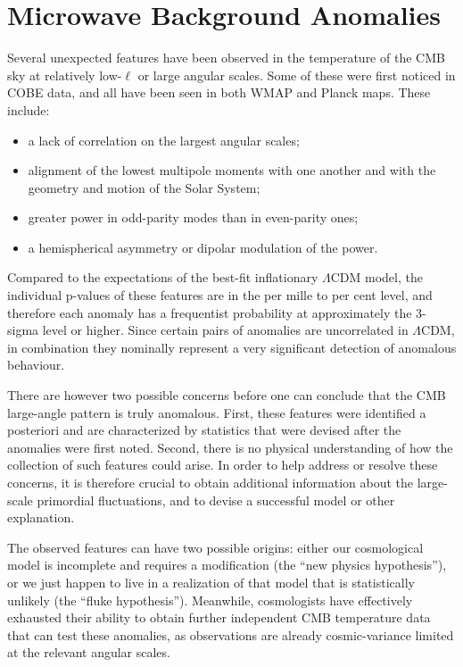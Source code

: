 \section{Microwave Background Anomalies}

Several unexpected features have been observed in the temperature of the CMB sky at relatively low-$\ell$ or large angular scales.  Some of these were first noticed in COBE data,  
and all have been seen in both WMAP and Planck maps.  These include: 
\begin{itemize}
  \item a lack of correlation on the largest angular scales;
  \item alignment of the lowest multipole moments with one another and with the geometry and motion of the Solar System;
 \item greater power in odd-parity modes than in even-parity ones;
  \item a hemispherical asymmetry or dipolar modulation of the power.
\end{itemize}

Compared to the expectations of the best-fit inflationary $\Lambda$CDM model, the individual p-values of these features are in the per mille to per cent level, and therefore each anomaly has a frequentist probability at approximately the 3-sigma level or higher.  Since certain pairs of anomalies are uncorrelated in $\Lambda$CDM, in combination they nominally represent a very significant detection of anomalous behaviour. 

There are however two possible concerns before one can conclude that the CMB large-angle pattern is truly anomalous. First, these features were identified a posteriori and are characterized by statistics that were devised after the anomalies were first noted. Second, there is no physical understanding of how the collection of such features could arise. In order to help address or resolve these concerns, it is therefore crucial to obtain additional information about the large-scale primordial fluctuations, and to devise a successful model or other explanation.

The observed features can have two possible origins: either our cosmological model is incomplete and requires a modification (the “new physics hypothesis”), or we just happen to live in a realization of that model that is statistically unlikely (the “fluke hypothesis”).   Meanwhile, cosmologists have effectively exhausted their ability to obtain further independent CMB temperature data that can test these anomalies, as observations are already cosmic-variance limited at the relevant angular scales.

